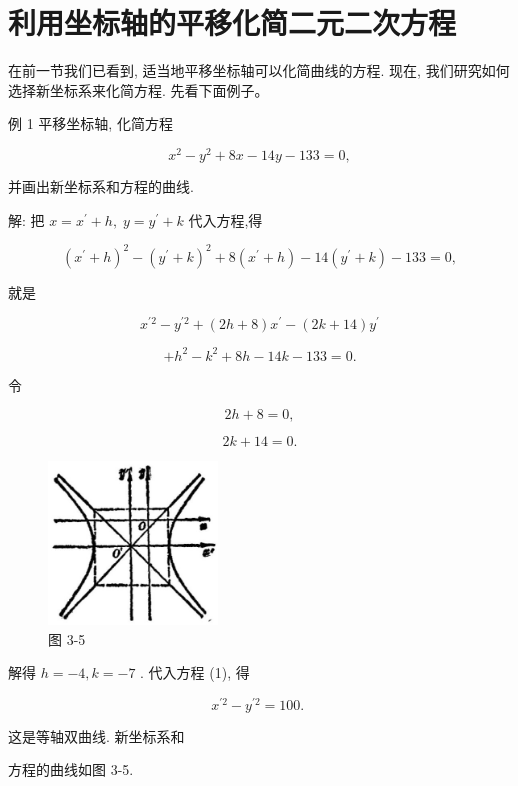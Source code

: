 \documentclass[lang=cn,newtx,10pt,scheme=chinese]{elegantbook}
\begin{document}
\section{利用坐标轴的平移化简二元二次方程}

在前一节我们已看到, 适当地平移坐标轴可以化简曲线的方程. 现在, 我们研究如何选择新坐标系来化简方程. 先看下面例子。

例 1 平移坐标轴, 化简方程

\[
    {x}^{2} - {y}^{2} + {8x} - {14y} - {133} = 0,
\]

并画出新坐标系和方程的曲线.

解: 把 \(x = {x}^{\prime } + h,\;y = {y}^{\prime } + k\) 代入方程,得

\[
    {\left( {x}^{\prime } + h\right) }^{2} - {\left( {y}^{\prime } + k\right) }^{2} + 8\left( {{x}^{\prime } + h}\right) - {14}\left( {{y}^{\prime } + k}\right) - {133} = 0,
\]

就是

\[
    {x}^{\prime 2} - {y}^{\prime 2} + \left( {{2h} + 8}\right) {x}^{\prime } - \left( {{2k} + {14}}\right) {y}^{\prime }
\]

\[
  + {h}^{2} - {k}^{2} + {8h} - {14k} - {133} = 0. \tag{1}
\]

令

\[
    {2h} + 8 = 0,
\]

\[
    {2k} + {14} = 0\text{.}
\]

\begin{figure}[h]
  \centering
  \includegraphics[max width=0.4\textwidth]{images/01912cc2-ffb6-728e-9ae7-b113ff05c64b_136_802845.jpg}
  \caption{图 3-5}
\end{figure}



解得 \(h = - 4,k = - 7\) . 代入方程 (1), 得

\[
    {x}^{\prime 2} - {y}^{\prime 2} = {100}\text{. }
\]

这是等轴双曲线. 新坐标系和

方程的曲线如图 3-5.
\end{document}
